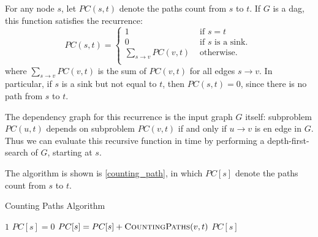 \begin{homeworkProblem}

For any node $s$, let $PC(s,t)$ denote the paths count
from $s$ to $t$. If $G$ is a dag, this function satisfies
the recurrence:
\begin{equation}
PC(s,t) = \left\{
    \begin{array}{ll}
        1 & \text{ if } s = t \\
        0 & \text{ if $s$ is a sink. } \\
        \sum_{s \rightarrow v} PC(v,t) & \text{ otherwise. }\\
    \end{array}
    \right.
\end{equation}
where $\sum_{s \rightarrow v} PC(v,t)$ is the sum of $PC(v,t)$
for all edges $s \rightarrow v$. In particular, if $s$
is a sink but not equal to $t$, then $PC(s,t) = 0$,
since there is no path from $s$ to $t$.

The dependency graph for this recurrence is the input graph
$G$ itself: subproblem $PC(u,t)$ depends on subproblem
$PC(v,t)$ if and only if $u \rightarrow v$ is en edge in $G$.
Thus we can evaluate this recursive function in 
time by performing a depth-first-search of $G$, starting at $s$.

The algorithm is shown is \cref{counting_path},
in which $PC[s]$ denote the paths count from $s$ to $t$.

\begin{algorithm}[H]
\caption{Counting Paths Algorithm}\label{counting_path}
\begin{algorithmic}[1]
            \Return $1$
        \EndIf
            \State $PC[s] = 0$
                \State $PC[s] = PC[s] + \textsc{CountingPaths} (v,t)$
            \EndFor
        \EndIf
    \Return $PC[s]$
    \EndProcedure
\end{algorithmic}
\end{algorithm}
\end{homeworkProblem}
